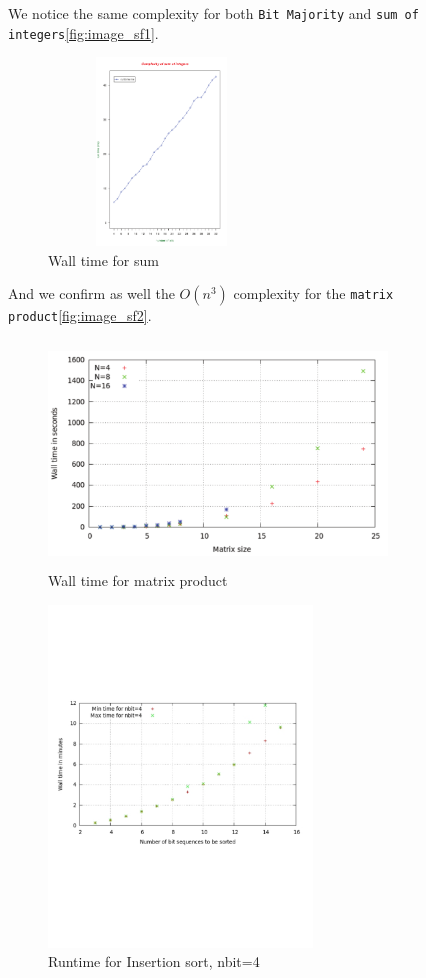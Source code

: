 \documentclass{acm_proc_article-sp}
\begin{document}
We notice the same complexity for both \texttt{Bit Majority} and \texttt{sum of integers}\autoref{fig:image_sf1}.
\begin{figure}[!H]%
\centering
\includegraphics[width=6cm, height=5cm]{f8.pdf} 
\caption{Wall time for sum} 
\label{fig:image_sf1} %
\end{figure}

And we confirm as well the $O(n^{3})$ complexity for the \texttt{matrix product}\autoref{fig:image_sf2}.
\begin{figure}[!H]%
\centering
\includegraphics[width=9cm, height=6cm]{f9.pdf} 
\caption{Wall time for matrix product} 
\label{fig:image_sf2} %
\end{figure}

\begin{figure}[!h]
\centering
\includegraphics[width=7cm]{fsort3.pdf} 
\caption{Runtime for Insertion sort, nbit=4} 
\label{fig:image_sf3} %
\end{figure}
\end{document}
